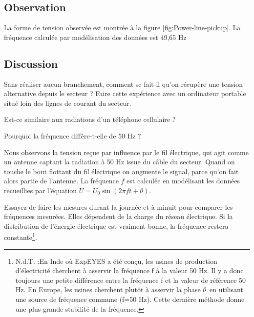 \documentclass{book}
\begin{document}
\subsection{Observation}


La forme de tension observée est montrée à la figure  \ref{fig:Power-line-pickup}. La fréquence calculée par modélisation des données est 49,65 Hz

\subsection{Discussion}


Sans réaliser aucun branchement, comment se fait-il qu'on récupère une tension alternative depuis le secteur ? Faire cette expérience avec un ordinateur portable situé loin des lignes de courant du secteur.



Est-ce similaire aux radiations d'un téléphone cellulaire ?



Pourquoi la fréquence diffère-t-elle de 50 Hz ?



Nous observons la tension reçue par influence par le fil électrique, qui agit comme un antenne captant la radiation à 50 Hz issue du câble du secteur. Quand on touche le bout flottant du fil électrique on augmente le signal, parce qu'on fait alors partie de l'antenne. La fréquence $f$  est calculée en modélisant les données recueillies par l'équation $U=U_{0}\sin(2\pi ft+\theta)$.



Essayez de faire les mesures durant la journée et à minuit pour comparer les fréquences mesurées. Elles dépendent de la charge du réseau électrique. Si la distribution de l'énergie électrique est vraiment bonne, la fréquence restera constante\footnote{N.d.T. :En Inde où ExpEYES a été conçu, les usines de production d'électricité cherchent à asservir la fréquence f à la valeur 50 Hz. Il y a donc toujours une petite différence entre la fréquence f et la valeur de référence 50 Hz. En Europe, les usines cherchent plutôt à asservir la phase $\theta\,$ en utilisant une source de fréquence commune (f=50 Hz). Cette dernière méthode donne une plus grande stabilité de la fréquence.}.






\end{document}
